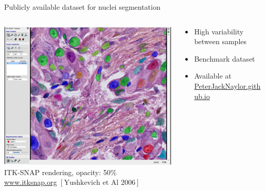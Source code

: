 \documentclass{beamer}
\begin{document}
\begin{frame}{Publicly available dataset for nuclei segmentation}

\begin{columns}
\vspace{-3cm}

\begin{column}{0.6\textwidth}
\begin{center}
\includegraphics[scale = 0.5, center]{ITKSnap.png} \\
ITK-SNAP rendering, opacity: 50\% \\
\url{www.itksnap.org}
$\left[ \text{Yushkevich et Al 2006}\right]$
\end{center}
\end{column}

\begin{column}{0.5\textwidth}
\begin{small}
\begin{itemize}
\item High variability between samples
\item Benchmark dataset
\item Available at \url{PeterJackNaylor.github.io} 
\end{itemize}
\end{small}
\end{column}

\end{columns}

\end{frame}
\end{document}
